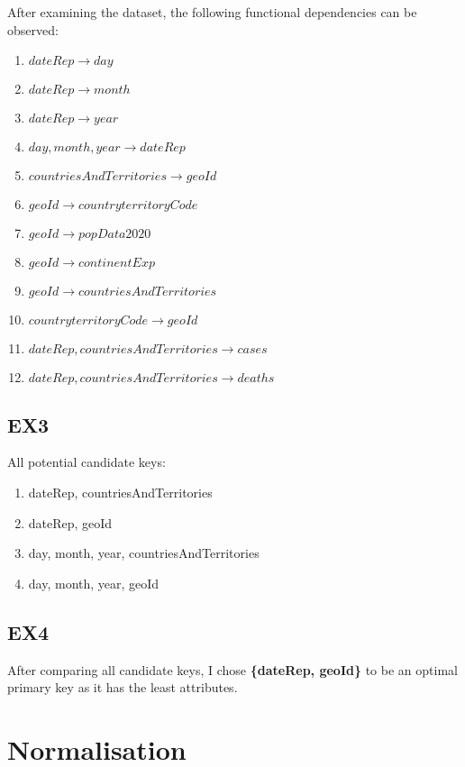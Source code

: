 \documentclass{article}
\begin{document}
After examining the dataset, the following functional dependencies can be observed:

\begin{enumerate}
    \item $dateRep \rightarrow  day$
    \item $dateRep \rightarrow  month$
    \item $dateRep \rightarrow  year$
    \item $day, month, year \rightarrow  dateRep$
    \item $countriesAndTerritories \rightarrow  geoId$
    \item $geoId \rightarrow  countryterritoryCode$
    \item $geoId \rightarrow  popData2020$
    \item $geoId \rightarrow  continentExp$
    \item $geoId \rightarrow  countriesAndTerritories$
    \item $countryterritoryCode \rightarrow  geoId$
    \item $dateRep, countriesAndTerritories \rightarrow  cases$
    \item $dateRep, countriesAndTerritories \rightarrow  deaths$
\end{enumerate}

\subsection{EX3}

All potential candidate keys:

\begin{enumerate}
    \item dateRep, countriesAndTerritories
    \item dateRep, geoId
    \item day, month, year, countriesAndTerritories
    \item day, month, year, geoId
\end{enumerate}

\subsection{EX4}
After comparing all candidate keys, I chose \textbf{\{dateRep, geoId\}} to be an optimal primary key as it has the least attributes.

\section{Normalisation}
\end{document}
